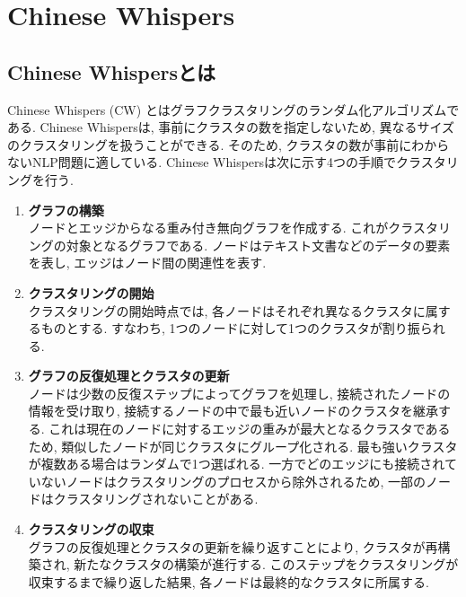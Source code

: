 
\section{Chinese Whispers}
\subsection{Chinese Whispersとは}
Chinese Whispers (CW) \cite{chinese-whispers}とはグラフクラスタリングのランダム化アルゴリズムである. Chinese Whispersは, 事前にクラスタの数を指定しないため, 異なるサイズのクラスタリングを扱うことができる. そのため, クラスタの数が事前にわからないNLP問題に適している. 
Chinese Whispersは次に示す4つの手順でクラスタリングを行う. 

\begin{enumerate}[label=\textbf{\arabic*.}]
  \item \textbf{グラフの構築}\\
  ノードとエッジからなる重み付き無向グラフを作成する. これがクラスタリングの対象となるグラフである. ノードはテキスト文書などのデータの要素を表し, エッジはノード間の関連性を表す. \\
  
  \item \textbf{クラスタリングの開始}\\
  クラスタリングの開始時点では, 各ノードはそれぞれ異なるクラスタに属するものとする. すなわち, 1つのノードに対して1つのクラスタが割り振られる. \\
  
  \item \textbf{グラフの反復処理とクラスタの更新}\\
  ノードは少数の反復ステップによってグラフを処理し, 接続されたノードの情報を受け取り, 接続するノードの中で最も近いノードのクラスタを継承する. これは現在のノードに対するエッジの重みが最大となるクラスタであるため, 類似したノードが同じクラスタにグループ化される. 
  最も強いクラスタが複数ある場合はランダムで1つ選ばれる. 一方でどのエッジにも接続されていないノードはクラスタリングのプロセスから除外されるため, 一部のノードはクラスタリングされないことがある. \\
  
  \item \textbf{クラスタリングの収束}\\
  グラフの反復処理とクラスタの更新を繰り返すことにより, クラスタが再構築され, 新たなクラスタの構築が進行する. このステップをクラスタリングが収束するまで繰り返した結果, 各ノードは最終的なクラスタに所属する. 
\end{enumerate}